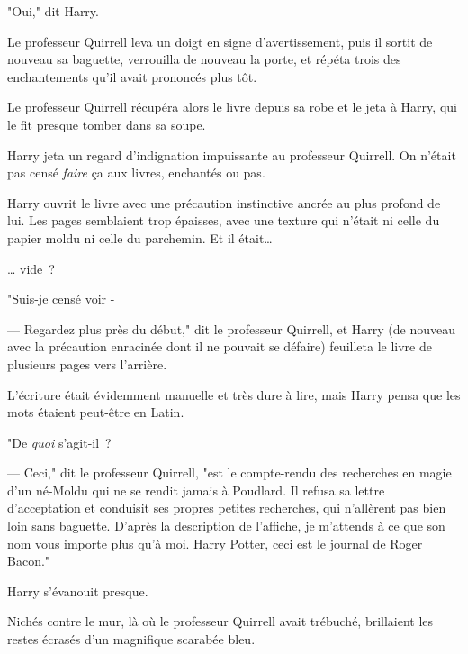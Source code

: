 "Oui," dit Harry.

Le professeur Quirrell leva un doigt en signe d'avertissement, puis il sortit de nouveau sa baguette, verrouilla de nouveau la porte, et répéta trois des enchantements qu'il avait prononcés plus tôt.

Le professeur Quirrell récupéra alors le livre depuis sa robe et le jeta à Harry, qui le fit presque tomber dans sa soupe.

Harry jeta un regard d'indignation impuissante au professeur Quirrell. On n'était pas censé \emph{faire} ça aux livres, enchantés ou pas.

Harry ouvrit le livre avec une précaution instinctive ancrée au plus profond de lui. Les pages semblaient trop épaisses, avec une texture qui n'était ni celle du papier moldu ni celle du parchemin. Et il était…

… vide~?

"Suis-je censé voir -

--- Regardez plus près du début," dit le professeur Quirrell, et Harry (de nouveau avec la précaution enracinée dont il ne pouvait se défaire) feuilleta le livre de plusieurs pages vers l'arrière.

L'écriture était évidemment manuelle et très dure à lire, mais Harry pensa que les mots étaient peut-être en Latin.

"De \emph{quoi} s'agit-il~?

--- Ceci," dit le professeur Quirrell, "est le compte-rendu des recherches en magie d'un né-Moldu qui ne se rendit jamais à Poudlard. Il refusa sa lettre d'acceptation et conduisit ses propres petites recherches, qui n'allèrent pas bien loin sans baguette. D'après la description de l'affiche, je m'attends à ce que son nom vous importe plus qu'à moi. Harry Potter, ceci est le journal de Roger Bacon."

Harry s'évanouit presque.

Nichés contre le mur, là où le professeur Quirrell avait trébuché, brillaient les restes écrasés d'un magnifique scarabée bleu. 

